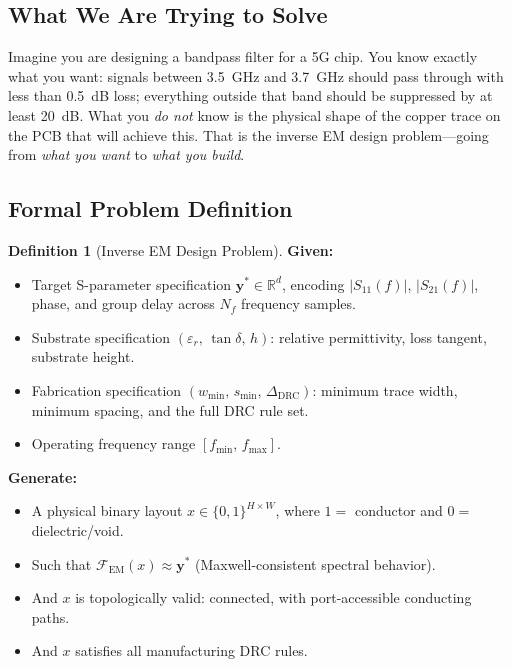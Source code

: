\documentclass[12pt,a4paper]{article}
\newcommand{\FEM}{\mathcal{F}_{\mathrm{EM}}}
\newcommand{\ystar}{\mathbf{y}^{*}}
\newcommand{\HW}{H \times W}
\theoremstyle{definition}
\newtheorem{definition}{Definition}[section]
\theoremstyle{plain}
\theoremstyle{remark}
\begin{document}
\subsection{What We Are Trying to Solve}

Imagine you are designing a bandpass filter for a 5G chip.
You know exactly what you want: signals between 3.5~GHz and 3.7~GHz should pass through
with less than 0.5~dB loss; everything outside that band should be suppressed by at least
20~dB.
What you \emph{do not} know is the physical shape of the copper trace on the PCB that will
achieve this.
That is the inverse EM design problem—going from \emph{what you want} to \emph{what you
build}.

\subsection{Formal Problem Definition}
\label{sec:problem:formal}

\begin{definition}[Inverse EM Design Problem]
\textbf{Given:}
\begin{itemize}
  \item Target S-parameter specification $\ystar \in \mathbb{R}^{d}$, encoding
        $|S_{11}(f)|$, $|S_{21}(f)|$, phase, and group delay across $N_f$ frequency samples.
  \item Substrate specification $(\varepsilon_r,\, \tan\delta,\, h)$: relative permittivity,
        loss tangent, substrate height.
  \item Fabrication specification $(w_{\min},\, s_{\min},\, \Delta_{\mathrm{DRC}})$: minimum
        trace width, minimum spacing, and the full DRC rule set.
  \item Operating frequency range $[f_{\min},\, f_{\max}]$.
\end{itemize}

\textbf{Generate:}
\begin{itemize}
  \item A physical binary layout $x \in \{0,1\}^{\HW}$, where $1 =$ conductor and
        $0 =$ dielectric/void.
  \item Such that $\FEM(x) \approx \ystar$ (Maxwell-consistent spectral behavior).
  \item And $x$ is topologically valid: connected, with port-accessible conducting paths.
  \item And $x$ satisfies all manufacturing DRC rules.
\end{itemize}
\end{definition}
\end{document}
